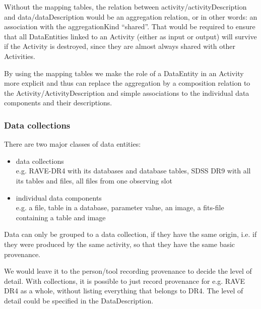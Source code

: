
Without the mapping tables, the relation between activity/activityDescription and data/dataDescription would be an aggregation relation, or in other words: an association with the aggregationKind ``shared''. That would be required to ensure that all DataEntities linked to an Activity (either as input or output) will survive if the Activity is destroyed, since they are almost always shared with other Activities. 

By using the mapping tables we make the role of a DataEntity in an Activity more explicit and thus can replace the aggregation by a composition relation to the Activity/ActivityDescription and simple associations to the individual data components and their descriptions. 


\subsubsection{Data collections}

There are two major classes of data entities: 

\begin{itemize} 
\item data collections \\e.g. RAVE-DR4 with its databases and database tables, SDSS DR9 with 
all its tables and files, all files from one observing slot\\

\item individual data components\\
e.g. a file, table in a database, parameter value, an image, a fits-file containing a table and image

\end{itemize}


Data can only be grouped to a data collection, if they have the same origin, i.e. if they were
produced by the same activity, so that they have the same basic provenance.

We would leave it to the person/tool recording provenance to decide the level of detail.
With collections, it is possible to just record provenance for e.g. RAVE DR4 as a 
whole, without listing everything that belongs to DR4. The level of detail could be specified in the  DataDescription.

